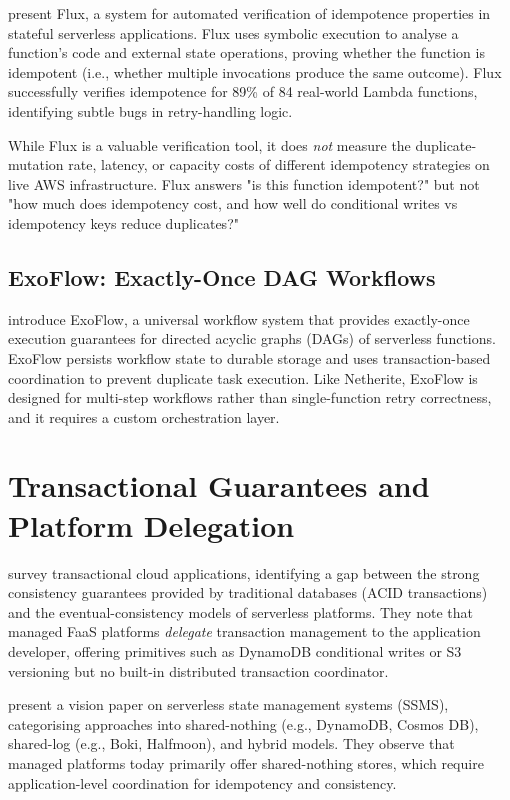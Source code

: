 \citet{Ding2023Flux} present Flux, a system for automated verification of idempotence properties in stateful serverless applications. Flux uses symbolic execution to analyse a function's code and external state operations, proving whether the function is idempotent (i.e., whether multiple invocations produce the same outcome). Flux successfully verifies idempotence for 89\% of 84 real-world Lambda functions, identifying subtle bugs in retry-handling logic.

While Flux is a valuable verification tool, it does \textit{not} measure the duplicate-mutation rate, latency, or capacity costs of different idempotency strategies on live AWS infrastructure. Flux answers "is this function idempotent?" but not "how much does idempotency cost, and how well do conditional writes vs idempotency keys reduce duplicates?"

\subsection{ExoFlow: Exactly-Once DAG Workflows}

\citet{Zhuang2023ExoFlow} introduce ExoFlow, a universal workflow system that provides exactly-once execution guarantees for directed acyclic graphs (DAGs) of serverless functions. ExoFlow persists workflow state to durable storage and uses transaction-based coordination to prevent duplicate task execution. Like Netherite, ExoFlow is designed for multi-step workflows rather than single-function retry correctness, and it requires a custom orchestration layer.

\section{Transactional Guarantees and Platform Delegation}

\citet{Laigner2025Transactional} survey transactional cloud applications, identifying a gap between the strong consistency guarantees provided by traditional databases (ACID transactions) and the eventual-consistency models of serverless platforms. They note that managed FaaS platforms \textit{delegate} transaction management to the application developer, offering primitives such as DynamoDB conditional writes or S3 versioning but no built-in distributed transaction coordinator.

\citet{Li2024SSMS} present a vision paper on serverless state management systems (SSMS), categorising approaches into shared-nothing (e.g., DynamoDB, Cosmos DB), shared-log (e.g., Boki, Halfmoon), and hybrid models. They observe that managed platforms today primarily offer shared-nothing stores, which require application-level coordination for idempotency and consistency.

